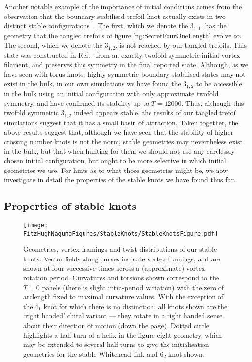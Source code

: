 Another notable example of the importance of initial conditions comes from the observation that the boundary stabilised trefoil knot actually exists in two distinct stable configurations~\citep{Maucher2017}. The first, which we denote the $3_{1,1}$, has the geometry that the tangled trefoils of figure \ref{fig:SecretFourOneLength} evolve to. The second, which we denote the $3_{1,2}$, is not reached by our tangled trefoils. This state was constructed in Ref.~\citep{Maucher2017} from an exactly twofold symmetric initial vortex filament, and preserves this symmetry in the final reported state. Although, as we have seen with torus knots, highly symmetric boundary stabilised states may not exist in the bulk, in our own simulations we have found the $3_{1,2}$ to be accessible in the bulk using an initial configuration with only approximate twofold symmetry, and have confirmed its stability up to $T=12000$. Thus, although this twofold symmetric $3_{1,2}$ indeed appears stable, the results of our tangled trefoil simulations suggest that it has a small basin of attraction. Taken together, the above results suggest that, although we have seen that the stability of higher crossing number knots is not the norm, stable geometries may nevertheless exist in the bulk, but that when hunting for them we should not use any carelessly chosen initial configuration, but ought to be more selective in which initial geometries we use. For hints as to what those geometries might be, we now investigate in detail the properties of the stable knots we have found thus far.

\subsection{Properties of stable knots}
\begin{figure}[hbtp]
    \texttt{[image: \\FitzHughNagumoFigures/StableKnots/StableKnotsFigure.pdf]}
    \caption{Geometries, vortex framings and twist distributions of our stable knots. Vector fields along curves indicate vortex framings, and are shown at four successive times across a (approximate) vortex rotation period. Curvatures and torsions shown correspond to the $T=0$ panels (there is slight intra-period variation) with the zero of arclength fixed to maximal curvature values. With the exception of the $4_1$ knot for which there is no distinction, all knots shown are the `right handed' chiral variant --- they rotate in a right handed sense about their direction of motion (down the page). Dotted circle highlights a half turn of a helix in the figure eight geometry, which may be extended to several half turns to give the initialisation geometries for the stable Whitehead link and $6_2$ knot shown. }
\label{fig:StableKnots}
\end{figure}


